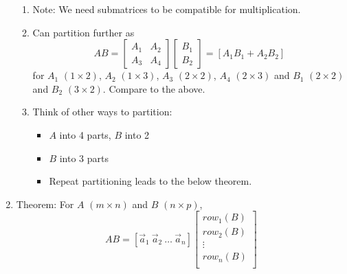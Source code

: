 \documentclass{article}
\begin{document}
\begin{enumerate}
\begin{enumerate}
\item Note: We need submatrices to be compatible for multiplication.
\item Can partition further as
\[
AB = \left[
\begin{array}{c|c}
A_1 & A_2 \\
\hline A_3 & A_4
\end{array}
\right] 
\left[
\begin{array}{c}
B_1 \\ \hline B_2
\end{array}
\right]
= [A_1B_1 + A_2B_2]
\]
for $A_1$ $(1 \times 2)$, $A_2$ $(1\times 3)$, $A_3$ $(2 \times 2)$, $A_4$ $(2\times 3)$ and $B_1$ $(2\times 2)$ and $B_2$ $(3\times 2)$. Compare to the above.
\item Think of other ways to partition:
\begin{itemize}
\item $A$ into 4 parts, $B$ into 2
\item $B$ into 3 parts
\item Repeat partitioning leads to the below theorem.
\end{itemize}
\end{enumerate}
\item Theorem: For $A$ $(m\times n)$ and $B$ $(n \times p)$, 
\[
AB = [\vec{a}_1 ~ \vec{a}_2 ~ \dots ~ \vec{a}_n]
\left[\begin{array}{c}
row_1(B) \\
row_2(B) \\
\vdots \\
row_n(B) \\
\end{array}\right]
\]


\end{enumerate}
\end{document}
